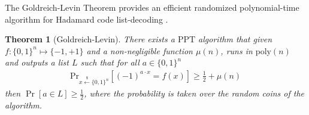 \documentclass{article}
\newtheorem{definition}{Definition}
\newtheorem{thm}{Theorem}
\begin{document}
The Goldreich-Levin Theorem provides an efficient randomized polynomial-time algorithm for Hadamard code list-decoding \cite{10.1145/73007.73010}.
\begin{thm}[Goldreich-Levin] \label{gl}
There exists a $\mathrm{PPT}$ algorithm that given $f:\{0,1\}^{n}\mapsto\{-1,+1\}$ and a non-negligible function $\mu(n)$, runs in $\mathrm{poly}(n)$ and outputs a list $L$ such that for all $a\in\{0,1\}^{n}$ \begin{align}\mathrm{Pr}_{x\overset{\$}{\leftarrow}\{0,1\}^{n}}\left[(-1)^{a\cdot x}=f(x)\right]\geq\frac{1}{2}+\mu(n)\end{align} 
then $\Pr[a\in L]\geq\frac{1}{2}$, where the probability is taken over the random coins of the algorithm.
\end{thm}

\end{document}
